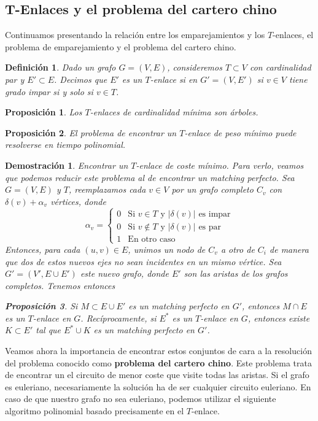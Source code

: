 \documentclass[twoside,a4paper,openright,12pt,tikz]{book}
\newtheorem{defi}{Definici\'on}[section]
\newtheorem{prop}{Proposici\'on}[section]
\newtheorem*{dem}{Demostración}
\begin{document}
\subsection{T-Enlaces y el problema del cartero chino}
Continuamos presentando la relación entre los emparejamientos y los $T$-enlaces, el problema de emparejamiento y el problema del cartero chino.
\begin{defi}
Dado un grafo $G=(V,E)$, consideremos $T\subset V$ con cardinalidad par y $E'\subset E$. Decimos que $E'$ es un $T$-enlace si en $G'=(V,E')$ si $v\in V$ tiene grado impar si y solo si $v\in T$.
\end{defi}
\begin{prop}
Los $T$-enlaces de cardinalidad mínima son árboles.
\end{prop}
\begin{prop}
El problema de encontrar un $T$-enlace de peso mínimo puede resolverse en tiempo polinomial.
\end{prop}
\begin{dem}
Encontrar un $T$-enlace de coste mínimo. Para verlo, veamos que podemos reducir este problema al de encontrar un matching perfecto. Sea $G=(V,E)$ y $T$, reemplazamos cada $v\in V$ por un grafo completo $C_v$ con $\delta(v)+\alpha_v$ vértices, donde
$$
\alpha_v = \begin{cases}
0 & \text{Si $v\in T$ y $|\delta(v)|$ es impar}\\
0 & \text{Si $v\notin T$ y $|\delta(v)|$ es par}\\
1 & \text{En otro caso}
\end{cases}
$$
Entonces, para cada $(u,v)\in E$, unimos un nodo de $C_v$ a otro de $C_i$ de manera que dos de estos nuevos ejes no sean incidentes en un mismo vértice. Sea $G'=(V',E\cup E')$ este nuevo grafo, donde $E'$ son las aristas de los grafos completos. Tenemos entonces
\begin{prop}
Si $M\subset E\cup E'$ es un matching perfecto en $G'$, entonces $M\cap E$ es un $T$-enlace en $G$. Recíprocamente, si $E^*$ es un $T$-enlace en $G$, entonces existe $K\subset E'$ tal que $E^*\cup K$ es un matching perfecto en $G'$.
\end{prop}
\end{dem}
Veamos ahora la importancia de encontrar estos conjuntos de cara a la resolución del problema conocido como \textbf{problema del cartero chino}. Este problema trata de encontrar un el circuito de menor coste que visite todas las aristas. Si el grafo es euleriano, necesariamente la solución ha de ser cualquier circuito euleriano. En caso de que nuestro grafo no sea euleriano, podemos utilizar el siguiente algoritmo polinomial basado precisamente en el $T$-enlace.
\end{document}
